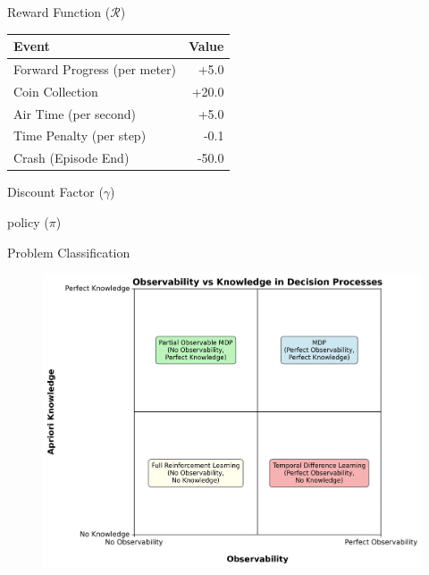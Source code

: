\documentclass[serif]{beamer}  %
\begin{document}
    \begin{frame}{Reward Function ($\mathcal{R}$)}
        \centering
        \renewcommand{\arraystretch}{1.5}
        \begin{tabular}{l r}
            \toprule
            \textbf{Event} & \textbf{Value} \\
            \midrule
            Forward Progress (per meter) & +5.0 \\
            Coin Collection & +20.0 \\
            Air Time (per second) & +5.0 \\
            Time Penalty (per step) & -0.1 \\
            Crash (Episode End) & -50.0 \\
            \bottomrule
        \end{tabular}
    \end{frame}

    \begin{frame}{Discount Factor ($\gamma$)}
        
    \end{frame}

    \begin{frame}{policy ($\pi$)}
        
    \end{frame}

    \begin{frame}{Problem Classification}
        \begin{figure}
            \centering
            \includegraphics[width=0.8\linewidth]{images/knowledge_vs_observability.png}
        \end{figure}
    \end{frame}
\end{document}
